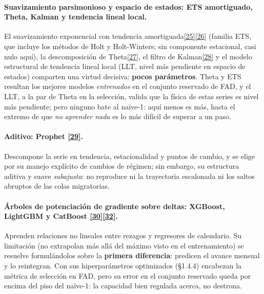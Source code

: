 \documentclass[12pt,letterpaper]{report}
\newcommand{\cita}[1]{\hyperref[bib:#1]{[#1]}}
\begin{document}
\paragraph{Suavizamiento parsimonioso y espacio de estados: ETS amortiguado, Theta, Kalman y
tendencia lineal local.} El suavizamiento exponencial con tendencia
amortiguada\cita{25}\cita{26} (familia ETS, que incluye los métodos de Holt y Holt-Winters; sin
componente estacional, casi nulo aquí), la descomposición de Theta\cita{27}, el filtro de
Kalman\cita{28} y el modelo estructural de tendencia lineal local (LLT, nivel más pendiente
en espacio de estados) comparten una virtud decisiva: \textbf{pocos parámetros}. Theta y ETS
resultan los mejores modelos \textit{entrenados} en el conjunto reservado de FAD, y el LLT, a
la par de Theta en la selección, valida que la física de estas series es nivel más pendiente;
pero ninguno bate al naïve-1: aquí menos es más, hasta el extremo de que \textit{no aprender
nada} es lo más difícil de superar a un paso.

\paragraph{Aditivo: Prophet \cita{29}.} Descompone la serie en tendencia, estacionalidad y puntos
de cambio, y se elige por su manejo explícito de cambios de régimen; sin embargo, su estructura
aditiva y suave \textit{subajusta}: no reproduce ni la trayectoria escalonada ni los saltos
abruptos de las colas migratorias.

\paragraph{Árboles de potenciación de gradiente sobre deltas: XGBoost, LightGBM y CatBoost
\cita{30}\textendash\cita{32}.} Aprenden relaciones no lineales entre rezagos y regresores de
calendario. Su limitación (no extrapolan más allá del máximo visto en el entrenamiento) se
resuelve formulándolos sobre la \textbf{primera diferencia}: predicen el avance mensual y lo
reintegran. Con sus hiperparámetros optimizados (§1.4.4) encabezan la métrica de selección en
FAD, pero su error en el conjunto reservado queda por encima del piso del naïve-1: la
capacidad bien regulada acerca, no destrona.
\end{document}
